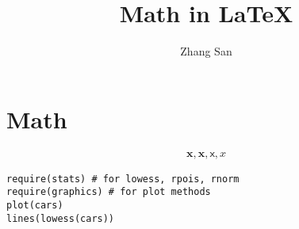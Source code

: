 \documentclass[b5paper]{article}
\title{Math in LaTeX}
\author{Zhang San}
\begin{document}
\maketitle
\tableofcontents
\section{Math}
\begin{align}
\boldsymbol{x},\mathbf{x},\mathsf{x},x
\end{align}
\begin{verbatim}
require(stats) # for lowess, rpois, rnorm
require(graphics) # for plot methods
plot(cars)
lines(lowess(cars))
\end{verbatim}
\end{document}
